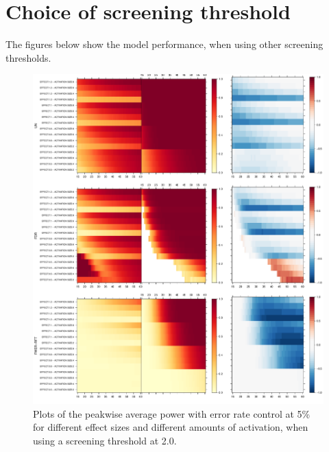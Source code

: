 \section{Choice of screening threshold \label{App.thresholds}}

The figures below show the model performance, when using other screening thresholds.

\begin{center}
\begin{figure}[h]
\includegraphics[scale=0.25]{figures/FIG_SIM_power_15_NOMASK_2_0.pdf}
\caption{Plots of the peakwise average power with error rate control at 5\% for different effect sizes and different amounts of activation, when using a screening threshold at 2.0.}
\end{figure}
\end{center}


